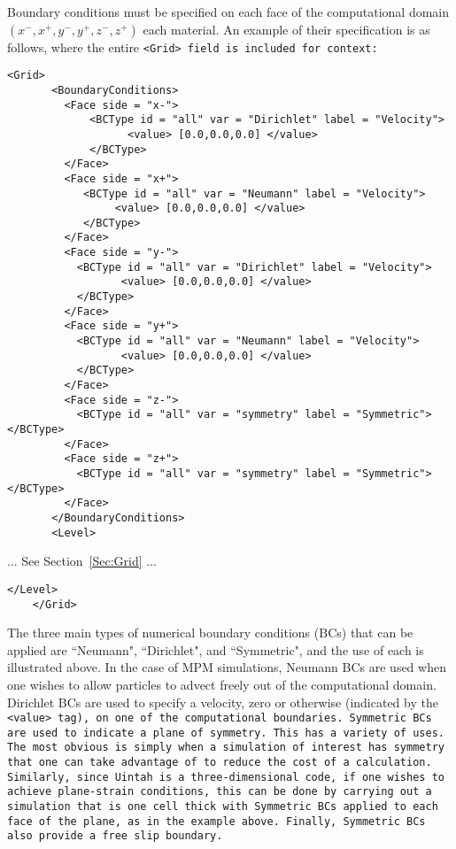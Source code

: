 Boundary conditions must be specified on each face of the computational
domain $(x^-, x^+, y^-, y^+,z^-,z^+)$ each material.  An example of their
specification is as follows, where the entire \tt <Grid> \normalfont field
is included for context:
\begin{Verbatim}[fontsize=\footnotesize]
    <Grid>
       <BoundaryConditions>
         <Face side = "x-">
             <BCType id = "all" var = "Dirichlet" label = "Velocity">
                   <value> [0.0,0.0,0.0] </value>
             </BCType>
         </Face>
         <Face side = "x+">
            <BCType id = "all" var = "Neumann" label = "Velocity">
                 <value> [0.0,0.0,0.0] </value>
            </BCType>
         </Face>
         <Face side = "y-">
           <BCType id = "all" var = "Dirichlet" label = "Velocity">
                  <value> [0.0,0.0,0.0] </value>
           </BCType>
         </Face>
         <Face side = "y+">
           <BCType id = "all" var = "Neumann" label = "Velocity">
                  <value> [0.0,0.0,0.0] </value>
           </BCType>
         </Face>
         <Face side = "z-">
           <BCType id = "all" var = "symmetry" label = "Symmetric"> </BCType>
         </Face>
         <Face side = "z+">
           <BCType id = "all" var = "symmetry" label = "Symmetric"> </BCType>
         </Face>
       </BoundaryConditions>
       <Level>
\end{Verbatim}

... See Section~\ref{Sec:Grid} ...

\begin{Verbatim}[fontsize=\footnotesize]
       </Level>
    </Grid>
\end{Verbatim}

The three main types of numerical boundary conditions (BCs) that can
be applied are ``Neumann", ``Dirichlet", and ``Symmetric", and the use of
each is illustrated above.  In the case of
MPM simulations, Neumann BCs are used when one wishes to allow particles to
advect freely out of the computational domain.  Dirichlet BCs are used to
specify a velocity, zero or otherwise (indicated by the \tt <value> \normalfont
tag), on one of the computational boundaries.
Symmetric BCs are used to indicate a plane of symmetry.  This has a variety
of uses.  The most obvious is simply when a simulation of interest has symmetry
that one can take advantage of to reduce the cost of a calculation.  Similarly,
since Uintah is a three-dimensional code, if one wishes to achieve plane-strain
conditions, this can be done by carrying out a simulation that is one cell thick
with Symmetric BCs applied to each face of the plane, as in the example above.
Finally, Symmetric BCs also provide a free slip boundary.

